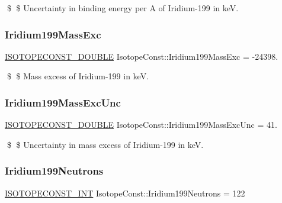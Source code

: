 \$ \$ Uncertainty in binding energy per A of Iridium-\/199 in keV. \mbox{\label{group___isotope_const-_iridium-_ir199_ga21c299c388b0f176ae19970c5bf8e46a}} 
\subsubsection{\texorpdfstring{Iridium199\+Mass\+Exc}{Iridium199MassExc}}
{\footnotesize\ttfamily \mbox{\hyperlink{group___isotope_const-_macros_ga8f45a7272ce02c0b4c65c44636ed719a}{I\+S\+O\+T\+O\+P\+E\+C\+O\+N\+S\+T\+\_\+\+D\+O\+U\+B\+LE}} Isotope\+Const\+::\+Iridium199\+Mass\+Exc = -\/24398.}

\$ \$ Mass excess of Iridium-\/199 in keV. \mbox{\label{group___isotope_const-_iridium-_ir199_gaec4e25f6ec85015a58e06fb2fb77c9ed}} 
\subsubsection{\texorpdfstring{Iridium199\+Mass\+Exc\+Unc}{Iridium199MassExcUnc}}
{\footnotesize\ttfamily \mbox{\hyperlink{group___isotope_const-_macros_ga8f45a7272ce02c0b4c65c44636ed719a}{I\+S\+O\+T\+O\+P\+E\+C\+O\+N\+S\+T\+\_\+\+D\+O\+U\+B\+LE}} Isotope\+Const\+::\+Iridium199\+Mass\+Exc\+Unc = 41.}

\$ \$ Uncertainty in mass excess of Iridium-\/199 in keV. \mbox{\label{group___isotope_const-_iridium-_ir199_ga14737a82a981a79b31c78b66c17c01d9}} 
\subsubsection{\texorpdfstring{Iridium199\+Neutrons}{Iridium199Neutrons}}
{\footnotesize\ttfamily \mbox{\hyperlink{group___isotope_const-_macros_ga5f18360b3e99483a35c32d789e62621c}{I\+S\+O\+T\+O\+P\+E\+C\+O\+N\+S\+T\+\_\+\+I\+NT}} Isotope\+Const\+::\+Iridium199\+Neutrons = 122}

